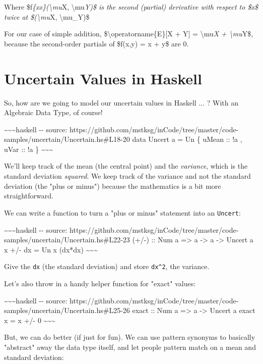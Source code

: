\documentclass[]{article}
\begin{document}
Where \$f\emph{\{xx\}(\textbackslash{}mu}X, \textbackslash{}mu\emph{Y)\$ is the
second (partial) derivative with respect to \$x\$ twice at
\$(\textbackslash{}mu}X, \textbackslash{}mu\_Y)\$

For our case of simple addition, \$\textbackslash{}operatorname\{E\}{[}X + Y{]}
= \textbackslash{}mu\emph{X + \textbackslash{}mu}Y\$, because the second-order
partials of \$f(x,y) = x + y\$ are 0.

\section{Uncertain Values in Haskell}

So, how are we going to model our uncertain values in Haskell ... ? With an
Algebraic Data Type, of course!

\textasciitilde{}\textasciitilde{}\textasciitilde{}haskell -\/- source:
https://github.com/mstksg/inCode/tree/master/code-samples/uncertain/Uncertain.hs\#L18-20
data Uncert a = Un \{ uMean :: !a , uVar :: !a \}
\textasciitilde{}\textasciitilde{}\textasciitilde{}

We'll keep track of the mean (the central point) and the \emph{variance}, which
is the standard deviation \emph{squared}. We keep track of the variance and not
the standard deviation (the "plus or minus") because the mathematics is a bit
more straightforward.

We can write a function to turn a "plus or minus" statement into an
\texttt{Uncert}:

\textasciitilde{}\textasciitilde{}\textasciitilde{}haskell -\/- source:
https://github.com/mstksg/inCode/tree/master/code-samples/uncertain/Uncertain.hs\#L22-23
(+/-) :: Num a =\textgreater{} a -\textgreater{} a -\textgreater{} Uncert a x
+/- dx = Un x (dx*dx) \textasciitilde{}\textasciitilde{}\textasciitilde{}

Give the \texttt{dx} (the standard deviation) and store \texttt{dx\^{}2}, the
variance.

Let's also throw in a handy helper function for "exact" values:

\textasciitilde{}\textasciitilde{}\textasciitilde{}haskell -\/- source:
https://github.com/mstksg/inCode/tree/master/code-samples/uncertain/Uncertain.hs\#L25-26
exact :: Num a =\textgreater{} a -\textgreater{} Uncert a exact x = x +/- 0
\textasciitilde{}\textasciitilde{}\textasciitilde{}

But, we can do better (if just for fun). We can use pattern synonyms to
basically "abstract" away the data type itself, and let people pattern match on
a mean and standard deviation:
\end{document}
